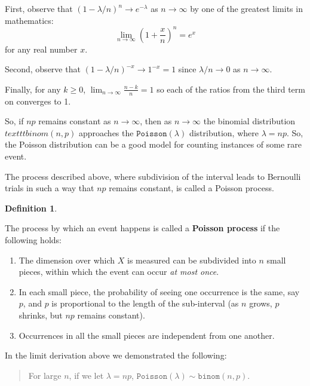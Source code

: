 \documentclass[
]{book}
\providecommand{\tightlist}{%
  \setlength{\itemsep}{0pt}\setlength{\parskip}{0pt}}
\theoremstyle{definition}
\newtheorem{definition}{Definition}[chapter]
\theoremstyle{definition}
\theoremstyle{definition}
\theoremstyle{definition}
\theoremstyle{remark}
\begin{document}
First, observe that \((1-\lambda/n)^n \to e^{-\lambda}\) as \(n \to \infty\) by one of the greatest limits in mathematics: \[\lim_{n \to \infty}\left(1+\frac{x}{n}\right)^n = e^x\] for any real number \(x\).

Second, observe that \((1-\lambda/n)^{-x} \to 1^{-x} = 1\) since \(\lambda/n \to 0\) as \(n \to \infty\).

Finally, for any \(k \geq 0\), \(\lim_{n \to \infty} \frac{n-k}{n} = 1\) so each of the ratios from the third term on converges to 1.

So, if \(np\) remains constant as \(n \to \infty\), then as \(n \to \infty\) the binomial distribution \(texttt{binom}(n,p)\) approaches the \(\texttt{Poisson}(\lambda)\) distribution, where \(\lambda = np\). So, the Poisson distribution can be a good model for counting instances of some rare event.

The process described above, where subdivision of the interval leads to Bernoulli trials in such a way that \(np\) remains constant, is called a Poisson process.

\begin{definition}
\protect\hypertarget{def:def-pois-process}{}\label{def:def-pois-process}

The process by which an event happens is called a \textbf{Poisson process} if the following holds:

\begin{enumerate}
\def\labelenumi{\arabic{enumi}.}
\tightlist
\item
  The dimension over which \(X\) is measured can be subdivided into \(n\) small pieces, within which the event can occur \emph{at most once}.
\item
  In each small piece, the probability of seeing one occurrence is the same, say \(p\), and \(p\) is proportional to the length of the sub-interval (as \(n\) grows, \(p\) shrinks, but \(np\) remains constant).
\item
  Occurrences in all the small pieces are independent from one another.
\end{enumerate}

\end{definition}

In the limit derivation above we demonstrated the following:

\begin{quote}
For large \(n\), if we let \(\lambda = np\), \(\texttt{Poisson}(\lambda) \sim  \texttt{binom}(n,p)\).
\end{quote}
\end{document}
